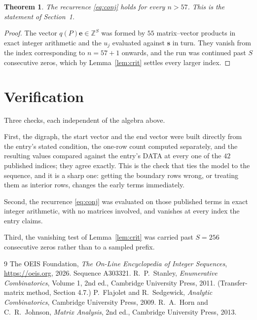 \documentclass[11pt,a4paper]{article}
\theoremstyle{plain}
\newtheorem{theorem}{Theorem}
\theoremstyle{definition}
\begin{document}
\begin{theorem}
The recurrence \eqref{eq:conj} holds for every $n>57$. This is the statement of
Section~1.
\end{theorem}

\begin{proof}
The vector $q(P)\mathbf{e}\in\mathbb{Z}^{S}$ was formed by $55$ matrix--vector
products in exact integer arithmetic and the $u_j$ evaluated against $\mathbf{s}$ in turn.
They vanish from the index corresponding to $n=57+1$ onwards, and the run was continued
past $S$ consecutive zeros, which by Lemma~\ref{lem:crit} settles every larger index.
\end{proof}

\section{Verification}

Three checks, each independent of the algebra above.

First, the digraph, the start vector and the end vector were built directly from the
entry's stated condition, the one-row count computed separately, and the resulting values
compared against the entry's DATA at every one of the $42$ published indices; they
agree exactly. This is the check that ties the model to the sequence, and it is a sharp one:
getting the boundary rows wrong, or treating them as interior rows, changes the early terms
immediately.

Second, the recurrence \eqref{eq:conj} was evaluated on those published terms in exact
integer arithmetic, with no matrices involved, and vanishes at every index the entry claims.

Third, the vanishing test of Lemma~\ref{lem:crit} was carried past $S=256$ consecutive
zeros rather than to a sampled prefix.

\begin{thebibliography}{9}
 The OEIS Foundation, \emph{The On-Line Encyclopedia of Integer
Sequences}, \url{https://oeis.org}, 2026. Sequence A303321.
 R.~P.~Stanley, \emph{Enumerative Combinatorics}, Volume 1, 2nd ed.,
Cambridge University Press, 2011. (Transfer-matrix method, Section 4.7.)
 P.~Flajolet and R.~Sedgewick, \emph{Analytic Combinatorics}, Cambridge
University Press, 2009.
 R.~A.~Horn and C.~R.~Johnson, \emph{Matrix Analysis}, 2nd ed., Cambridge
University Press, 2013.
\end{thebibliography}
\end{document}
